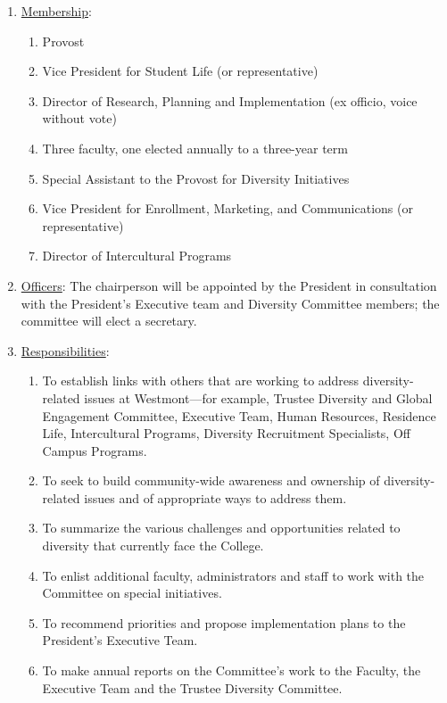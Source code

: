 					\begin{enumerate}[label=\alph*)]
						\item{\underline{Membership}:
							\begin{enumerate}[label=\arabic*)]
								\item{Provost}
								\item{Vice President for Student Life (or representative)}
								\item{Director of Research, Planning and Implementation (ex officio, voice without vote)}
								\item{Three faculty, one elected annually to a three-year term}
								\item{Special Assistant to the Provost for Diversity Initiatives}
								\item{Vice President for Enrollment, Marketing, and Communications (or representative)}
								\item{Director of Intercultural Programs}
							\end{enumerate}
						}
						\item{\underline{Officers}:
							The chairperson will be appointed by the President in consultation with the President's Executive team and Diversity Committee members; the committee will elect a secretary.}
						\item{\underline{Responsibilities}:
							\begin{enumerate}[label=\arabic*)]
								\item{To establish links with others that are working to address diversity-related issues at Westmont---for example, Trustee Diversity and Global Engagement Committee, Executive Team, Human Resources, Residence Life, Intercultural Programs, Diversity Recruitment Specialists, Off Campus Programs.}
								\item{To seek to build community-wide awareness and ownership of diversity-related issues and of appropriate ways to address them.}
								\item{To summarize the various challenges and opportunities related to diversity that currently face the College.}
								\item{To enlist additional faculty, administrators and staff to work with the Committee on special initiatives.}
								\item{To recommend priorities and propose implementation plans to the President's Executive Team.}
								\item{To make annual reports on the Committee's work to the Faculty, the Executive Team and the Trustee Diversity Committee.}
							\end{enumerate}
						}
					\end{enumerate}
